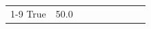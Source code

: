 \begin{table}[H]
\begin{tabular}{lllrlllll}
\cline{1-9}
True & 50.0%
\cline{1-9}
\bottomrule
\end{tabular}
\end{table}
